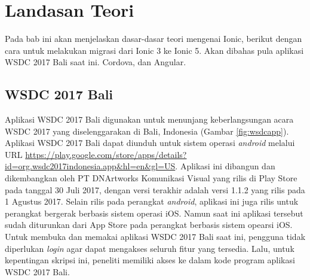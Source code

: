 \chapter{Landasan Teori}
\label{chap:teori}

Pada bab ini akan menjelaskan dasar-dasar teori mengenai Ionic, berikut dengan cara untuk melakukan migrasi dari Ionic 3 ke Ionic 5. Akan dibahas pula aplikasi WSDC 2017 Bali saat ini. Cordova, dan Angular.

\section{WSDC 2017 Bali}
\label{sec:wsdc2017bali}

Aplikasi WSDC 2017 Bali digunakan untuk menunjang keberlangsungan acara WSDC 2017 yang diselenggarakan di Bali, Indonesia (Gambar \ref{fig:wsdcapp}). Aplikasi WSDC 2017 Bali dapat diunduh untuk sistem operasi {\it android} melalui URL \url{https://play.google.com/store/apps/details?id=org.wsdc2017indonesia.app&hl=en&gl=US}. Aplikasi ini dibangun dan dikembangkan oleh PT DNArtworks Komunikasi Visual yang rilis di Play Store pada tanggal 30 Juli 2017, dengan versi terakhir adalah versi 1.1.2 yang rilis pada 1 Agustus 2017. Selain rilis pada perangkat {\it android}, aplikasi ini juga rilis untuk perangkat bergerak berbasis sistem operasi iOS. Namun saat ini aplikasi tersebut sudah diturunkan dari App Store pada perangkat berbasis sistem opearsi iOS. Untuk membuka dan memakai aplikasi WSDC 2017 Bali saat ini, pengguna tidak diperlukan {\it login} agar dapat mengakses seluruh fitur yang tersedia. Lalu, untuk kepentingan skripsi ini, peneliti memiliki akses ke dalam kode program aplikasi WSDC 2017 Bali.

